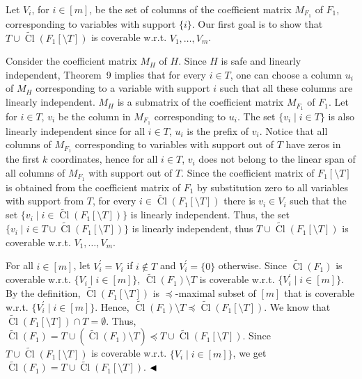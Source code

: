 Let $V_{i}$, for $i\in[m]$, be the set of columns of the coefficient matrix $M_{F_{1}}$ of $F_{1}$, corresponding to variables with support $\{i\}$. Our first goal is to show that $T\cup\widetilde{\mathop{\mathrm{Cl}}}(F_{1}[\setminus T])$ is coverable w.r.t. $V_{1},\dots,V_{m}$.\par



Consider the coefficient matrix $M_{H}$ of $H$. Since $H$ is safe and linearly independent, Theorem 9 implies that for every $i\in T$, one can choose a column $u_{i}$ of $M_{H}$ corresponding to a variable with support $i$ such that all these columns are linearly independent. $M_{H}$ is a submatrix of the coefficient matrix $M_{F_{1}}$ of $F_{1}$. Let for $i\in T$, $v_{i}$ be the column in $M_{F_{1}}$ corresponding to $u_{i}$. The set $\{v_{i}\mid i\in T\}$ is also linearly independent since for all $i\in T$, $u_{i}$ is the prefix of $v_{i}$. Notice that all columns of $M_{F_{1}}$ corresponding to variables with support out of $T$ have zeros in the first $k$ coordinates, hence for all $i\in T$, $v_{i}$ does not belong to the linear span of all columns of $M_{F_{1}}$ with support out of $T$. Since the coefficient matrix of $F_{1}[\setminus T]$ is obtained from the coefficient matrix of $F_{1}$ by substitution zero to all variables with support from $T$, for every $i\in\widetilde{\mathop{\mathrm{Cl}}}(F_{1}[\setminus T])$ there is $v_{i}\in V_{i}$ such that the set $\{v_{i}\mid i\in\widetilde{\mathop{\mathrm{Cl}}}(F_{1}[\setminus T])\}$ is linearly independent. Thus, the set $\{v_{i}\mid i\in T\cup\widetilde{\mathop{\mathrm{Cl}}}(F_{1}[\setminus T])\}$ is linearly independent, thus $T\cup\widetilde{\mathop{\mathrm{Cl}}}(F_{1}[\setminus T])$ is coverable w.r.t. $V_{1},\dots,V_{m}$.\par



For all $i\in[m]$, let $V^{\prime}_{i}=V_{i}$ if $i\notin T$ and $V^{\prime}_{i}=\{0\}$ otherwise. Since $\widetilde{\mathop{\mathrm{Cl}}}(F_{1})$ is coverable w.r.t. $\{V_{i}\mid i\in[m]\}$, $\widetilde{\mathop{\mathrm{Cl}}}(F_{1})\setminus T$ is coverable w.r.t. $\{V^{\prime}_{i}\mid i\in[m]\}$. By the definition, $\widetilde{\mathop{\mathrm{Cl}}}(F_{1}[\setminus T])$ is $\preceq$-maximal subset of $[m]$ that is coverable w.r.t. $\{V^{\prime}_{i}\mid i\in[m]\}$. Hence, $\widetilde{\mathop{\mathrm{Cl}}}(F_{1})\setminus T\preceq\widetilde{\mathop{\mathrm{Cl}}}(F_{1}[\setminus T])$.
We know that $\widetilde{\mathop{\mathrm{Cl}}}(F_{1}[\setminus T])\cap T=\emptyset$. Thus, $\widetilde{\mathop{\mathrm{Cl}}}(F_{1})=T\cup(\widetilde{\mathop{\mathrm{Cl}}}(F_{1})\setminus T)\preceq T\cup\widetilde{\mathop{\mathrm{Cl}}}(F_{1}[\setminus T])$. Since $T\cup\widetilde{\mathop{\mathrm{Cl}}}(F_{1}[\setminus T])$ is coverable w.r.t. $\{V_{i}\mid i\in[m]\}$, we get $\widetilde{\mathop{\mathrm{Cl}}}(F_{1})=T\cup\widetilde{\mathop{\mathrm{Cl}}}(F_{1}[\setminus T])$.
$\hfill\blacktriangleleft$\par



